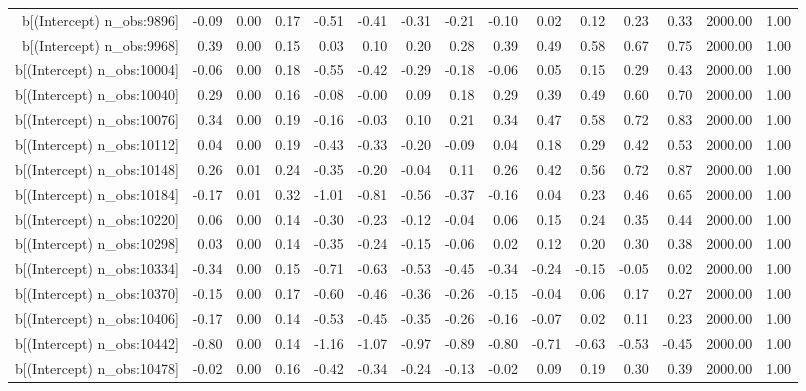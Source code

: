 \begin{table}[ht]
\begin{tabular}{rrrrrrrrrrrrrrr}
  b[(Intercept) n\_obs:9896] & -0.09 & 0.00 & 0.17 & -0.51 & -0.41 & -0.31 & -0.21 & -0.10 & 0.02 & 0.12 & 0.23 & 0.33 & 2000.00 & 1.00 \\ 
  b[(Intercept) n\_obs:9968] & 0.39 & 0.00 & 0.15 & 0.03 & 0.10 & 0.20 & 0.28 & 0.39 & 0.49 & 0.58 & 0.67 & 0.75 & 2000.00 & 1.00 \\ 
  b[(Intercept) n\_obs:10004] & -0.06 & 0.00 & 0.18 & -0.55 & -0.42 & -0.29 & -0.18 & -0.06 & 0.05 & 0.15 & 0.29 & 0.43 & 2000.00 & 1.00 \\ 
  b[(Intercept) n\_obs:10040] & 0.29 & 0.00 & 0.16 & -0.08 & -0.00 & 0.09 & 0.18 & 0.29 & 0.39 & 0.49 & 0.60 & 0.70 & 2000.00 & 1.00 \\ 
  b[(Intercept) n\_obs:10076] & 0.34 & 0.00 & 0.19 & -0.16 & -0.03 & 0.10 & 0.21 & 0.34 & 0.47 & 0.58 & 0.72 & 0.83 & 2000.00 & 1.00 \\ 
  b[(Intercept) n\_obs:10112] & 0.04 & 0.00 & 0.19 & -0.43 & -0.33 & -0.20 & -0.09 & 0.04 & 0.18 & 0.29 & 0.42 & 0.53 & 2000.00 & 1.00 \\ 
  b[(Intercept) n\_obs:10148] & 0.26 & 0.01 & 0.24 & -0.35 & -0.20 & -0.04 & 0.11 & 0.26 & 0.42 & 0.56 & 0.72 & 0.87 & 2000.00 & 1.00 \\ 
  b[(Intercept) n\_obs:10184] & -0.17 & 0.01 & 0.32 & -1.01 & -0.81 & -0.56 & -0.37 & -0.16 & 0.04 & 0.23 & 0.46 & 0.65 & 2000.00 & 1.00 \\ 
  b[(Intercept) n\_obs:10220] & 0.06 & 0.00 & 0.14 & -0.30 & -0.23 & -0.12 & -0.04 & 0.06 & 0.15 & 0.24 & 0.35 & 0.44 & 2000.00 & 1.00 \\ 
  b[(Intercept) n\_obs:10298] & 0.03 & 0.00 & 0.14 & -0.35 & -0.24 & -0.15 & -0.06 & 0.02 & 0.12 & 0.20 & 0.30 & 0.38 & 2000.00 & 1.00 \\ 
  b[(Intercept) n\_obs:10334] & -0.34 & 0.00 & 0.15 & -0.71 & -0.63 & -0.53 & -0.45 & -0.34 & -0.24 & -0.15 & -0.05 & 0.02 & 2000.00 & 1.00 \\ 
  b[(Intercept) n\_obs:10370] & -0.15 & 0.00 & 0.17 & -0.60 & -0.46 & -0.36 & -0.26 & -0.15 & -0.04 & 0.06 & 0.17 & 0.27 & 2000.00 & 1.00 \\ 
  b[(Intercept) n\_obs:10406] & -0.17 & 0.00 & 0.14 & -0.53 & -0.45 & -0.35 & -0.26 & -0.16 & -0.07 & 0.02 & 0.11 & 0.23 & 2000.00 & 1.00 \\ 
  b[(Intercept) n\_obs:10442] & -0.80 & 0.00 & 0.14 & -1.16 & -1.07 & -0.97 & -0.89 & -0.80 & -0.71 & -0.63 & -0.53 & -0.45 & 2000.00 & 1.00 \\ 
  b[(Intercept) n\_obs:10478] & -0.02 & 0.00 & 0.16 & -0.42 & -0.34 & -0.24 & -0.13 & -0.02 & 0.09 & 0.19 & 0.30 & 0.39 & 2000.00 & 1.00 \\ 

\end{tabular}
\end{table}
